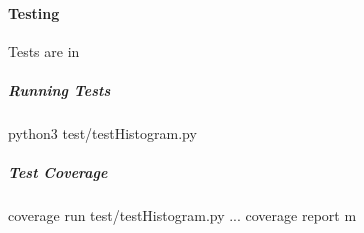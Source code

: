 \documentclass[letterpaper,10pt,english]{sphinxmanual}
\begin{document}
\paragraph{Testing}
\label{\detokenize{ref/util/Histogram:testing}}
Tests are in 


\subparagraph{Running Tests}
\label{\detokenize{ref/util/Histogram:running-tests}}
\begin{sphinxVerbatim}[commandchars=\\\{\}]
\PYGZdl{} python3 test/testHistogram.py
\end{sphinxVerbatim}


\subparagraph{Test Coverage}
\label{\detokenize{ref/util/Histogram:test-coverage}}
\begin{sphinxVerbatim}[commandchars=\\\{\}]
\PYGZdl{} coverage run test/testHistogram.py
...
\PYGZdl{} coverage report \PYGZhy{}m
\end{sphinxVerbatim}
\end{document}
